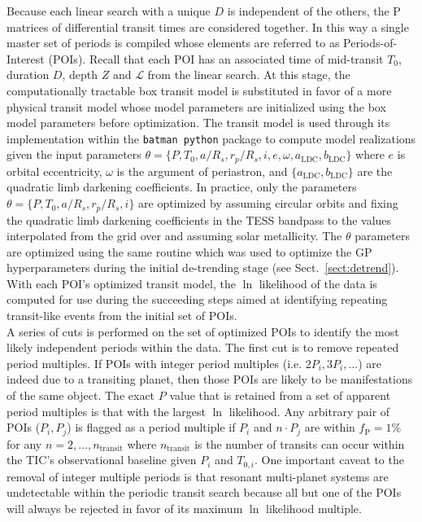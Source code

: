Because each linear search with a unique $D$ is independent of the others, the P matrices of
differential transit times are considered together. In this way a single master set of periods
is compiled whose elements are referred to as Periods-of-Interest (POIs). Recall that each POI has
an associated time of mid-transit $T_0$, duration $D$, depth $Z$ and $\mathcal{L}$
from the linear search. At this stage,
the computationally tractable box transit model is substituted in favor of a more
physical transit model whose model parameters are initialized using the box model parameters before
optimization. The \cite{mandel02} transit model is used through its implementation within the
\texttt{batman python} package \citep{kreidberg15} to
compute model realizations given the input parameters
$\theta=\{P, T_0,a/R_s, r_p/R_s,i,e,\omega,a_{\text{LDC}},b_{\text{LDC}}\}$ where $e$ is orbital eccentricity,
$\omega$ is the argument of periastron, and $\{a_{\text{LDC}},b_{\text{LDC}}\}$ are the quadratic limb
darkening coefficients. In practice, only
the parameters $\theta=\{P,T_0,a/R_s,r_p/R_s,i\}$ are optimized by assuming circular orbits and fixing
the quadratic limb darkening coefficients in the TESS bandpass to the values interpolated
from the \cite{claret17} grid over \teff{,} \logg{,} and assuming solar metallicity. The $\theta$
parameters are optimized using the same routine which was used to optimize the GP hyperparameters during
the initial de-trending stage (see Sect.~\ref{sect:detrend}). With each POI's optimized transit
model, the $\ln$ likelihood of the data is computed for use during the succeeding steps
aimed at identifying repeating transit-like events from the initial set of POIs. \\

A series of cuts is performed on the set of optimized POIs to identify the most likely independent
periods within the data. The first cut is to remove repeated period multiples.
If POIs with integer period multiples (i.e. $2P_i,3P_i,\dots$) are indeed due to a transiting planet,
then those POIs are likely to be manifestations of the same object. The exact $P$ value that is retained
from a set of apparent period multiples is that
with the largest $\ln$ likelihood. Any arbitrary pair of POIs ($P_i,P_j$) is flagged
as a period multiple if $P_i$ and $n\cdot P_j$ are within $f_{\text{P}}=1$\% for any
$n=2,\dots,n_{\text{transit}}$ where $n_{\text{transit}}$ is the number of transits can occur within the
TIC's observational baseline given $P_i$ and $T_{0,i}$.
One important caveat to the removal of integer multiple periods is that resonant multi-planet systems
are undetectable within the periodic transit search because all but one of the POIs will always be
rejected in favor of its maximum $\ln$ likelihood multiple. \\

